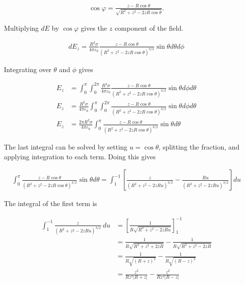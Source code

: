 \documentclass{article}
\begin{document}
\begin{align*}
    \cos \varphi = \frac{z - R\cos \theta}{\sqrt{R^2 + z^2 - 2zR\cos \theta}}.
\end{align*}

Multiplying $dE$ by $\cos \varphi$ gives the $z$ component of the field. 

\begin{align*}
    dE_z = \frac{R^2\sigma}{4\pi\varepsilon_0}\frac{z - R\cos \theta}{(R^2 + z^2 - 2zR\cos\theta)^{3/2}} \sin \theta d\theta d\phi
\end{align*}

Integrating over $\theta$ and $\phi$ gives 

\begin{align*}
    E_z &= \int_0^{\pi} \int_0^{2\pi} \frac{R^2\sigma}{4\pi\varepsilon_0}\frac{z - R\cos \theta}{(R^2 + z^2 - 2zR\cos\theta)^{3/2}} \sin \theta  d\phi d\theta \\
    E_z &= \frac{R^2\sigma}{4\pi\varepsilon_0} \int_0^{\pi} \int_0^{2\pi} \frac{z - R\cos \theta}{(R^2 + z^2 - 2zR\cos\theta)^{3/2}} \sin \theta  d\phi d\theta \\
    E_z&= \frac{2\pi R^2\sigma}{4\pi\varepsilon_0} \int_0^{\pi} \frac{z - R\cos \theta}{(R^2 + z^2 - 2zR\cos\theta)^{3/2}} \sin \theta d\theta
\end{align*}

The last integral can be solved by setting $u = \cos \theta$, splitting the fraction, and applying integration to each term. Doing this gives

\begin{align*}
    \int_0^{\pi} \frac{z - R\cos \theta}{(R^2 + z^2 - 2zR\cos\theta)^{3/2}} \sin \theta d\theta = \int_{1}^{-1} \left[ \frac{z}{(R^2 + z^2 - 2zRu)^{3/2}} - \frac{Ru}{(R^2 + z^2 - 2zRu)^{3/2}}\right] du
\end{align*}

The integral of the first term is 

\begin{align*}
    \int_{1}^{-1} \frac{z}{(R^2 + z^2 - 2zRu)^{3/2}}\ du &= \left[ \frac{1}{R\sqrt{R^2 + z^2 - 2zRu}} \right]^{-1}_{1}\\
    &=  \frac{1}{R\sqrt{R^2 + z^2 + 2zR}} - \frac{1}{R\sqrt{R^2 + z^2 - 2zR}} \\
    &= \frac{1}{R\sqrt{(R + z)^2}} - \frac{1}{R\sqrt{(R - z)^2}} \\
    &= \frac{z^2}{Rz^2|R + z|} - \frac{z^2}{Rz^2|R - z|} \\
\end{align*}
\end{document}
